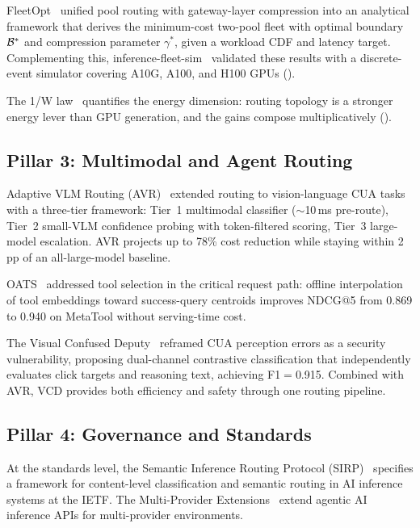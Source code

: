 FleetOpt~\cite{fleetopt2026} unified pool routing with gateway-layer
compression into an analytical framework that derives the
minimum-cost two-pool fleet with optimal boundary $\mathcal{B}^*$ and
compression parameter $\gamma^*$, given a workload CDF and latency
target.  
Complementing this, inference-fleet-sim~\cite{fleetsim2026} validated these
results with a discrete-event simulator covering A10G, A100, and
H100 GPUs ().

The 1/W law~\cite{onewlaw2026} quantifies the energy dimension:
routing topology is a stronger energy lever than GPU generation, and
the gains compose multiplicatively ().


\subsection{Pillar 3: Multimodal and Agent Routing}
\label{sec:foundation:agent}

Adaptive VLM Routing (AVR)~\cite{avr2026} extended routing to
vision-language CUA tasks with a three-tier framework: Tier~1
multimodal classifier ($\sim$10\,ms pre-route), Tier~2 small-VLM
confidence probing with token-filtered scoring, Tier~3 large-model
escalation.  AVR projects up to 78\% cost reduction while staying
within 2\,pp of an all-large-model baseline.

OATS~\cite{oats2026} addressed tool selection in the critical
request path: offline interpolation of tool embeddings toward
success-query centroids improves NDCG@5 from 0.869 to 0.940 on
MetaTool without serving-time cost.

The Visual Confused Deputy~\cite{vcd2026} reframed CUA perception
errors as a security vulnerability, proposing dual-channel
contrastive classification that independently evaluates click targets
and reasoning text, achieving F1$=$0.915.  Combined with AVR, VCD provides both efficiency and safety
through one routing pipeline.


\subsection{Pillar 4: Governance and Standards}
\label{sec:foundation:governance}

At the standards level, the Semantic Inference Routing Protocol
(SIRP)~\cite{sirp2025} specifies a framework for content-level
classification and semantic routing in AI inference systems at the
IETF.  The Multi-Provider Extensions~\cite{mpext2025} extend agentic
AI inference APIs for multi-provider environments.


